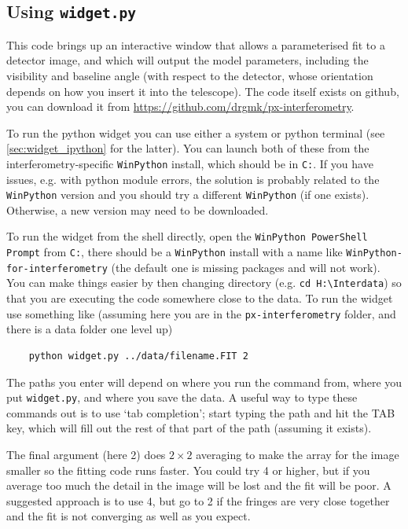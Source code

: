 \documentclass[11pt]{article}
\begin{document}
\subsection{Using \texttt{widget.py}}\label{sec:widget}

This code brings up an interactive window that allows a parameterised fit to a detector image, and which will output the model parameters, including the visibility and baseline angle (with respect to the detector, whose orientation depends on how you insert it into the telescope). The code itself exists on github, you can download it from
\href{https://github.com/drgmk/px-interferometry}{https://github.com/drgmk/px-interferometry}.

To run the python widget you can use either a system or python terminal (see \ref{sec:widget_ipython} for the latter). You can launch both of these from the interferometry-specific \texttt{WinPython} install, which should be in \texttt{C:}. If you have issues, e.g. with python module errors, the solution is probably related to the \texttt{WinPython} version and you should try a different \texttt{WinPython} (if one exists). Otherwise, a new version may need to be downloaded.

To run the widget from the shell directly, open the \texttt{WinPython PowerShell Prompt} from \texttt{C:}, there should be a \texttt{WinPython} install with a name like \texttt{WinPython-for-interferometry} (the default one is missing packages and will not work). You can make things easier by then changing directory (e.g. \texttt{cd H:\textbackslash Interdata}) so that you are executing the code somewhere close to the data. To run the widget use something like (assuming here you are in the \texttt{px-interferometry} folder, and there is a data folder one level up)
\begin{verbatim}
    python widget.py ../data/filename.FIT 2
\end{verbatim}
The paths you enter will depend on where you run the command from, where you put \texttt{widget.py}, and where you save the data. A useful way to type these commands out is to use `tab completion'; start typing the path and hit the TAB key, which will fill out the rest of that part of the path (assuming it exists).

The final argument (here 2) does $2 \times 2$ averaging to make the array for the image smaller so the fitting code runs faster. You could try 4 or higher, but if you average too much the detail in the image will be lost and the fit will be poor. A suggested approach is to use 4, but go to 2 if the fringes are very close together and the fit is not converging as well as you expect.
\end{document}
